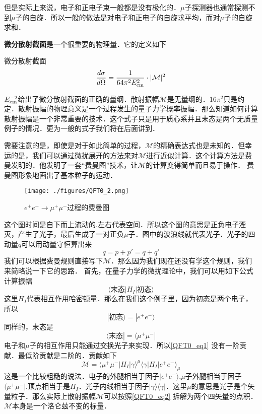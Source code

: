 但是实际上来说，电子和正电子束一般都是没有极化的．$\mu$子探测器也通常探测不到$\mu$子的自旋．所以一般的做法是对电子和正电子的自旋求平均，而对$\mu$子的自旋求和．

\textbf{微分散射截面}是一个很重要的物理量．它的定义如下
\begin{definition}{微分散射截面}
\begin{equation}\label{QFT0_eq3}
\frac{d\sigma}{d\Omega} = \frac{1}{64\pi^2E_{\rm cm}^2}\cdot |\mathcal M|^2
\end{equation}
\end{definition}
$E_{\rm cm}^{-2}$给出了微分散射截面的正确的量纲．散射振幅$\mathcal M$是无量纲的．$16\pi^2$只是约定．散射振幅的物理意义是一个过程发生的量子力学概率振幅．那么知道如何计算散射振幅是一个非常重要的技术．这个式子只是用于质心系并且末态是两个无质量例子的情况．更为一般的式子我们将在后面讲到．

需要注意的是，即使是对于如此简单的过程，$\mathcal M$的精确表达式也是未知的．但幸运的是，我们可以通过微扰展开的方法来对$\mathcal M$进行近似计算．这个计算方法是费曼发明的．他发明了一套“费曼图”技术，让$\mathcal M$的计算变得简单而且易于操作．
费曼图形象地画出了基本粒子的运动．

\begin{figure}[ht]
\centering
\texttt{[image: ./figures/QFT0\_2.png]}
\caption{$e^+e^-\rightarrow\mu^+\mu^-$过程的费曼图} \label{QFT0_fig2}
\end{figure}

这个图时间是自下而上流动的.左右代表空间．所以这个图的意思是正负电子湮灭，产生了光子，最后生成了一对正负$\mu$子．图中的波浪线就代表光子．光子的四动量$q$可以用动量守恒算出来
\begin{equation}
q=p+p'=q+q'
\end{equation}
我们可以根据费曼规则直接写下$\mathcal M$．那么因为我们现在还没有学这个规则，我们来简略说一下它的思路． 首先，在量子力学的微扰理论中，我们可以用如下公式计算振幅
\begin{equation} \label{QFT0_eq1}
\langle \text{末态} |H_I| \text{初态} \rangle
\end{equation}
这里$H_I$代表相互作用哈密顿量．那么在我们这个例子里，因为初态是两个电子，所以
\begin{equation}
| \text{初态} \rangle = | e^+ e^- \rangle
\end{equation}
同样的，末态是
\begin{equation}
\langle \text{末态} | = \langle \mu^+ \mu^- |
\end{equation}
电子和$\mu$子的相互作用只能通过交换光子来实现．所以\autoref{QFT0_eq1} 没有一阶贡献．最低阶贡献是二阶的．贡献如下
\begin{equation}\label{QFT0_eq2}
\mathcal M = \langle \mu^+ \mu^- | H_I | \gamma \rangle^\mu \langle \gamma | H_I | e^+ e^- \rangle_\mu 
\end{equation}
这是一个比较粗糙的说法．电子的外腿相当于因子$| e^+ e^- \rangle $,$\mu$子外腿相当于因子$\langle \mu^+ \mu^- |$.顶点相当于是$H_I$．光子内线相当于因子$|\gamma\rangle\langle\gamma|$．这里$\mu$的意思是光子是个矢量粒子．那么实际上散射振幅$\mathcal M$可以按照\autoref{QFT0_eq2} 拆解为两个四矢量的点积．$\mathcal M$本身是一个洛仑兹不变的标量．

